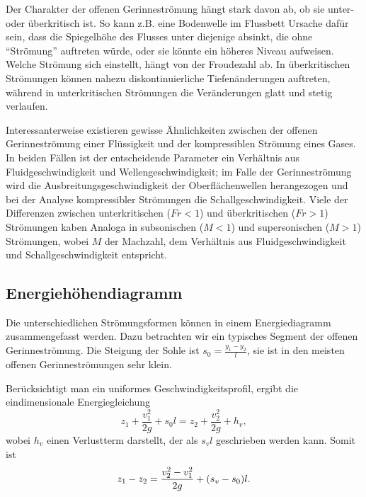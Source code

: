 \documentclass{lecture}
\begin{document}
    Der Charakter der offenen Gerinneströmung hängt stark davon ab, ob sie unter- oder überkritisch ist.
    So kann z.B. eine Bodenwelle im Flussbett Ursache dafür sein, dass die Spiegelhöhe des Flusses unter diejenige absinkt, die ohne ``Strömung'' auftreten würde, oder sie könnte ein höheres Niveau aufweisen.
    Welche Strömung sich einstellt, hängt von der Froudezahl ab.
    In überkritischen Strömungen können nahezu diskontinuierliche Tiefenänderungen auftreten, während in unterkritischen Strömungen die Veränderungen glatt und stetig verlaufen.

    Interessanterweise existieren gewisse Ähnlichkeiten zwischen der offenen Gerinneströmung einer Flüssigkeit und der kompressiblen Strömung eines Gases.
    In beiden Fällen ist der entscheidende Parameter ein Verhältnis aus Fluidgeschwindigkeit und Wellengeschwindigkeit; im Falle der Gerinneströmung wird die Ausbreitungsgeschwindigkeit der Oberflächenwellen herangezogen und bei der Analyse kompressibler Strömungen die Schallgeschwindigkeit.
    Viele der Differenzen zwischen unterkritischen (\(Fr < 1\)) und überkritischen (\(Fr > 1\)) Strömungen kaben Analoga in subsonischen (\(M < 1\)) und supersonischen (\(M > 1\)) Strömungen, wobei \(M\) der Machzahl, dem Verhältnis aus Fluidgeschwindigkeit und Schallgeschwindigkeit entspricht.


    \subsection*{Energiehöhendiagramm}

    Die unterschiedlichen Strömungsformen können in einem Energiediagramm zusammengefasst werden.
    Dazu betrachten wir ein typisches Segment der offenen Gerinneströmung.
    Die Steigung der Sohle ist \(s_0 = \frac{y_1 - y_2}{l}\), sie ist in den meisten offenen Gerinneströmungen sehr klein.

    Berücksichtigt man ein uniformes Geschwindigkeitsprofil, ergibt die eindimensionale Energiegleichung
    \[
        z_1 + \frac{v_1^2}{2g} + s_0 l = z_2 + \frac{v_2^2}{2g} + h_v,
    \]
    wobei \(h_v\) einen Verlustterm darstellt, der als \(s_v l\) geschrieben werden kann.
    Somit ist
    \[
        z_1 - z_2 = \frac{v_2^2 - v_1^2}{2g} + \parentheses*{s_v - s_0}l.
    \]
\end{document}
